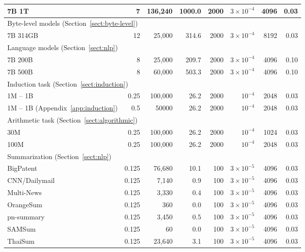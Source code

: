 \documentclass{article}
\theoremstyle{plain}
\theoremstyle{definition}
\theoremstyle{remark}
\begin{document}
\begin{table}[H]
{\begin{tabular}{lrrrrrrr}
        7B 1T & 7 & 136,240 & 1000.0 & 2000 & $3 \times 10^{-4}$ & 4096 & 0.03 \\
        \midrule
        \multicolumn{2}{l}{Byte-level models (Section~\ref{sect:byte-level})} \\
        \cmidrule(r{2em}){1-2}
        7B 314GB & 12 & 25,000 & 314.6 & 2000 & $3 \times 10^{-4}$ & 8192 & 0.03 \\
        \midrule
        \multicolumn{2}{l}{Language models (Section~\ref{sect:nlp})} \\
        \cmidrule(r{2em}){1-2}
        7B 200B & 8 & 25,000 & 209.7 & 2000 & $3 \times 10^{-4}$ & 4096 & 0.10 \\
        7B 500B & 8 & 60,000 & 503.3 & 2000 & $3 \times 10^{-4}$ & 4096 & 0.10 \\
        \midrule
        \multicolumn{2}{l}{Induction task (Section~\ref{sect:induction})} \\
        \cmidrule(r{3em}){1-2}
        1M -- 1B& 0.25 & 100,000 & 26.2 & 2000 & $10^{-4}$ & 2048 & 0.03 \\
        1M -- 1B (Appendix~\ref{app:induction}) & 0.5 & 50000 & 26.2 & 2000 & $10^{-4}$ & 2048 & 0.03 \\
        \midrule
        \multicolumn{2}{l}{Arithmetic task (Section~\ref{sect:algorithmic})} \\
        \cmidrule(r{3em}){1-2}
        30M & 0.25 & 100,000 & 26.2 & 2000 & $10^{-4}$ & 1024 & 0.03 \\
        100M & 0.25 & 100,000 & 26.2 & 2000 & $10^{-4}$ & 2048 & 0.03 \\
        \midrule
        \multicolumn{2}{l}{Summarization (Section~\ref{sect:nlp})} \\
        \cmidrule(r{3em}){1-2}
        BigPatent & 0.125 & 76,680 & 10.1 & 100 & $3 \times 10^{-5}$ & 4096 & 0.03 \\
        CNN/Dailymail & 0.125 & 7,140 & 0.9 & 100 & $3 \times 10^{-5}$ & 4096 & 0.03 \\
        Multi-News & 0.125 & 3,330 & 0.4 & 100 & $3 \times 10^{-5}$ & 4096 & 0.03 \\
        OrangeSum & 0.125 & 360 & 0.0 & 100 & $3 \times 10^{-5}$ & 4096 & 0.03 \\
        pn-summary & 0.125 & 3,450 & 0.5 & 100 & $3 \times 10^{-5}$ & 4096 & 0.03 \\
        SAMSum & 0.125 & 60 & 0.0 & 100 & $3 \times 10^{-5}$ & 4096 & 0.03 \\
        ThaiSum & 0.125 & 23,640 & 3.1 & 100 & $3 \times 10^{-5}$ & 4096 & 0.03 \\

\end{tabular}}
\end{table}
\end{document}
